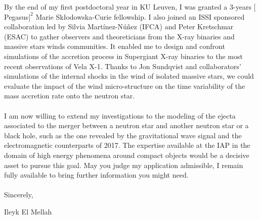 \documentclass[12pt]{letter}
\begin{document}
\begin{letter} {}
\newpage 


\hspace*{0.5cm} By the end of my first postdoctoral year in KU Leuven, I was granted a 3-years $[$Pegasus$]^2$ Marie Sk\l{}odowska-Curie fellowship. I also joined an ISSI sponsored collaboration led by Silvia Mart\'{i}nez-N\'{u}\~{n}ez (IFCA) and Peter Kretschmar (ESAC) to gather observers and theoreticians from the X-ray binaries and massive stars winds communities. It enabled me to design and confront simulations of the accretion process in Supergiant X-ray binaries to the most recent observations of Vela X-1. Thanks to Jon Sundqvist and collaborators' simulations of the internal shocks in the wind of isolated massive stars, we could evaluate the impact of the wind micro-structure on the time variability of the mass accretion rate onto the neutron star.\\ \\
\hspace*{0.5cm} I am now willing to extend my investigations to the modeling of the ejecta associated to the merger between a neutron star and another neutron star or a black hole, such as the one revealed by the gravitational wave signal and the electromagnetic counterparts of 2017. The expertise available at the IAP in the domain of high energy phenomena around compact objects would be a decisive asset to pursue this goal. May you judge my application admissible, I remain fully available to bring further information you might need.\\ \\
 
Sincerely,
 
\closing{Ileyk El Mellah} 


  \end{letter}
  
  
 
\end{document}
